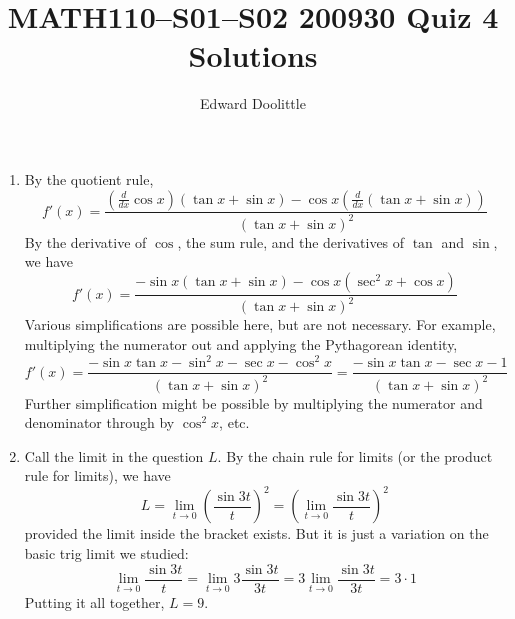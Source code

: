 \documentclass[12pt]{article}
\title{MATH110--S01--S02 200930 Quiz 4 Solutions}
\author{Edward Doolittle}
\begin{document}
\maketitle

\begin{enumerate}
\item By the quotient rule,
  \begin{equation*}
    f'(x) = \frac{\left(\frac{d}{dx} \cos x\right) (\tan x + \sin x)
    - \cos x \left( \frac{d}{dx} (\tan x + \sin x)\right)}{(\tan x + \sin x)^2}
  \end{equation*}
  By the derivative of $\cos$, the sum rule, and the derivatives of $\tan$
  and $\sin$, we have
  \begin{equation*}
    f'(x) = \frac{-\sin x(\tan x + \sin x) - \cos x (\sec^2 x + \cos x)}{
      (\tan x + \sin x)^2}
  \end{equation*}
  Various simplifications are possible here, but are not necessary.  For
  example, multiplying the numerator out and applying the Pythagorean identity,
  \begin{equation*}
    f'(x) = \frac{-\sin x \tan x - \sin^2 x - \sec x - \cos^2 x}{
      (\tan x + \sin x )^2}
    = \frac{-\sin x \tan x -\sec x -1}{(\tan x + \sin x)^2}
  \end{equation*}
  Further simplification might be possible by multiplying the numerator and
  denominator through by $\cos^2 x$, etc.
\item Call the limit in the question $L$.
  By the chain rule for limits (or the product rule for limits), we have
  \begin{equation*}
    L = \lim_{t\to 0} \left( \frac{\sin 3t}{t} \right)^2
    = \left( \lim_{t\to 0} \frac{\sin 3t}{t} \right)^2
  \end{equation*}
  provided the limit inside the bracket exists.  But it is just a variation
  on the basic trig limit we studied:
  \begin{equation*}
    \lim_{t\to 0} \frac{\sin 3t}{t}
    = \lim_{t\to 0} 3 \frac{\sin 3t}{3t}
    = 3 \lim_{t\to 0} \frac{\sin 3t}{3t}
    = 3 \cdot 1
  \end{equation*}
  Putting it all together, $L=9$.
\end{enumerate}
\end{document}
